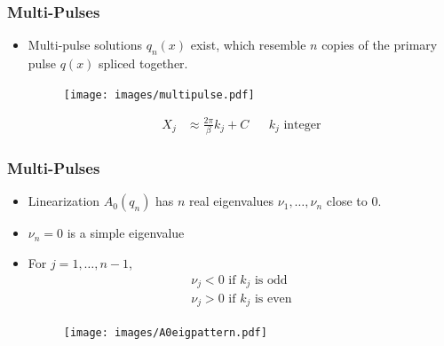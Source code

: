 \documentclass[16pt]{beamer}
\begin{document}
\begin{frame}
\frametitle{Multi-Pulses}   
    \begin{theorem}[Sandstede, 1997]
    \begin{itemize}
    \item Multi-pulse solutions $q_n(x)$ exist, which resemble $n$ copies of the primary pulse $q(x)$ spliced together.

	\begin{figure}
	\begin{center}
	\texttt{[image: images/multipulse.pdf]}
	\end{center}
	\end{figure}
	\begin{align*}
	 X_j &\approx \frac{2 \pi}{\beta} k_j + C && k_j \text{ integer}
	\end{align*}
	\end{itemize}
    \end{theorem}
\end{frame}

\begin{frame}
\frametitle{Multi-Pulses}   
    \begin{theorem}[Sandstede, 1997]
    \begin{itemize}
    	\item Linearization $A_0(q_n)$ has $n$ real eigenvalues $\nu_1, \dots, \nu_n$ close to 0. 

    	\item $\nu_n = 0$ is a simple eigenvalue

    	\item For $j = 1, \dots, n-1$,
        \begin{align*}
            \nu_j < 0 \text{ if } k_j \text{ is odd} \\
            \nu_j > 0 \text{ if } k_j \text{ is even} 
        \end{align*}
        \begin{figure}
		\begin{center}
		\texttt{[image: images/A0eigpattern.pdf]}
		\end{center}
		\end{figure}
    \end{itemize}
    \end{theorem}
\end{frame}
\end{document}
